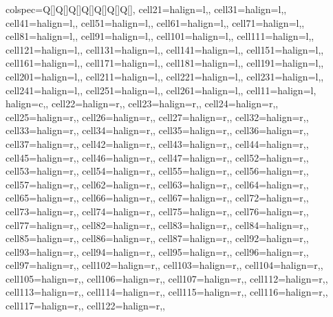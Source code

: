 \begin{table}
\centering
\begin{talltblr}[         %
caption={Summary Statistics by Group},
]                     %
{                     %
colspec={Q[]Q[]Q[]Q[]Q[]Q[]Q[]},
cell{2}{1}={}{halign=l,},
cell{3}{1}={}{halign=l,},
cell{4}{1}={}{halign=l,},
cell{5}{1}={}{halign=l,},
cell{6}{1}={}{halign=l,},
cell{7}{1}={}{halign=l,},
cell{8}{1}={}{halign=l,},
cell{9}{1}={}{halign=l,},
cell{10}{1}={}{halign=l,},
cell{11}{1}={}{halign=l,},
cell{12}{1}={}{halign=l,},
cell{13}{1}={}{halign=l,},
cell{14}{1}={}{halign=l,},
cell{15}{1}={}{halign=l,},
cell{16}{1}={}{halign=l,},
cell{17}{1}={}{halign=l,},
cell{18}{1}={}{halign=l,},
cell{19}{1}={}{halign=l,},
cell{20}{1}={}{halign=l,},
cell{21}{1}={}{halign=l,},
cell{22}{1}={}{halign=l,},
cell{23}{1}={}{halign=l,},
cell{24}{1}={}{halign=l,},
cell{25}{1}={}{halign=l,},
cell{26}{1}={}{halign=l,},
cell{1}{1}={}{halign=l, halign=c,},
cell{2}{2}={}{halign=r,},
cell{2}{3}={}{halign=r,},
cell{2}{4}={}{halign=r,},
cell{2}{5}={}{halign=r,},
cell{2}{6}={}{halign=r,},
cell{2}{7}={}{halign=r,},
cell{3}{2}={}{halign=r,},
cell{3}{3}={}{halign=r,},
cell{3}{4}={}{halign=r,},
cell{3}{5}={}{halign=r,},
cell{3}{6}={}{halign=r,},
cell{3}{7}={}{halign=r,},
cell{4}{2}={}{halign=r,},
cell{4}{3}={}{halign=r,},
cell{4}{4}={}{halign=r,},
cell{4}{5}={}{halign=r,},
cell{4}{6}={}{halign=r,},
cell{4}{7}={}{halign=r,},
cell{5}{2}={}{halign=r,},
cell{5}{3}={}{halign=r,},
cell{5}{4}={}{halign=r,},
cell{5}{5}={}{halign=r,},
cell{5}{6}={}{halign=r,},
cell{5}{7}={}{halign=r,},
cell{6}{2}={}{halign=r,},
cell{6}{3}={}{halign=r,},
cell{6}{4}={}{halign=r,},
cell{6}{5}={}{halign=r,},
cell{6}{6}={}{halign=r,},
cell{6}{7}={}{halign=r,},
cell{7}{2}={}{halign=r,},
cell{7}{3}={}{halign=r,},
cell{7}{4}={}{halign=r,},
cell{7}{5}={}{halign=r,},
cell{7}{6}={}{halign=r,},
cell{7}{7}={}{halign=r,},
cell{8}{2}={}{halign=r,},
cell{8}{3}={}{halign=r,},
cell{8}{4}={}{halign=r,},
cell{8}{5}={}{halign=r,},
cell{8}{6}={}{halign=r,},
cell{8}{7}={}{halign=r,},
cell{9}{2}={}{halign=r,},
cell{9}{3}={}{halign=r,},
cell{9}{4}={}{halign=r,},
cell{9}{5}={}{halign=r,},
cell{9}{6}={}{halign=r,},
cell{9}{7}={}{halign=r,},
cell{10}{2}={}{halign=r,},
cell{10}{3}={}{halign=r,},
cell{10}{4}={}{halign=r,},
cell{10}{5}={}{halign=r,},
cell{10}{6}={}{halign=r,},
cell{10}{7}={}{halign=r,},
cell{11}{2}={}{halign=r,},
cell{11}{3}={}{halign=r,},
cell{11}{4}={}{halign=r,},
cell{11}{5}={}{halign=r,},
cell{11}{6}={}{halign=r,},
cell{11}{7}={}{halign=r,},
cell{12}{2}={}{halign=r,},
}
\end{talltblr}
\end{table}
